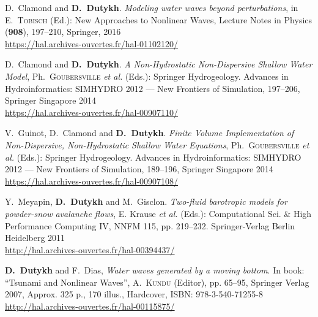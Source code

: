 \begin{etaremune}


  \item D.~Clamond and \textbf{D.~Dutykh}. \textit{Modeling water waves beyond perturbations}, in E.~\textsc{Tobisch} (Ed.): New Approaches to Nonlinear Waves, Lecture Notes in Physics (\textbf{908}), 197--210, Springer, 2016 \\ %
  \url{https://hal.archives-ouvertes.fr/hal-01102120/}
  


  \item D.~Clamond and \textbf{D.~Dutykh}. \textit{A Non-Hydrostatic Non-Dispersive Shallow Water Model}, Ph.~\textsc{Goubersville} \emph{et al.} (Eds.): Springer Hydrogeology. Advances in Hydroinformatics: SIMHYDRO 2012 --- New Frontiers of Simulation, 197--206, Springer Singapore 2014 \\ %
  \url{https://hal.archives-ouvertes.fr/hal-00907110/}

  \item V.~Guinot, D.~Clamond and \textbf{D.~Dutykh}. \textit{Finite Volume Implementation of Non-Dispersive, Non-Hydrostatic Shallow Water Equations}, Ph.~\textsc{Goubersville} \emph{et al.} (Eds.): Springer Hydrogeology. Advances in Hydroinformatics: SIMHYDRO 2012 --- New Frontiers of Simulation, 189--196, Springer Singapore 2014 \\ %
  \url{https://hal.archives-ouvertes.fr/hal-00907108/}
  


  \item Y.~Meyapin, \textbf{D.~Dutykh} and M.~Gisclon. \textit{Two-fluid barotropic models for powder-snow avalanche flows}, E. Krause \emph{et al.} (Eds.): Computational Sci. \& High Performance Computing IV, NNFM 115, pp. 219--232. Springer-Verlag Berlin Heidelberg 2011 \\ %
  \url{http://hal.archives-ouvertes.fr/hal-00394437/}
  

  
  \item \textbf{D.~Dutykh} and F.~Dias, \textit{Water waves generated by a moving bottom}. In book: ``Tsunami and Nonlinear Waves'', A.~\textsc{Kundu} (Editor), pp. 65--95, Springer Verlag 2007, Approx. 325 p., 170 illus., Hardcover, ISBN: 978-3-540-71255-8 \\ %
  \url{http://hal.archives-ouvertes.fr/hal-00115875/}
  

\end{etaremune}
